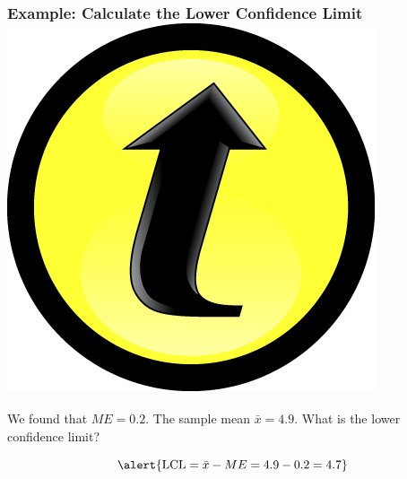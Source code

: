 \documentclass[handout]{beamer}
\begin{document}
\begin{frame}
\frametitle{Example: Calculate the Lower Confidence Limit \hfill \includegraphics[scale = 0.05]{./images/clicker}}


\begin{center}
\end{center}

We found that $ME=0.2$. The sample mean $\bar{x} = 4.9$. What is the lower confidence limit?
\pause

\vspace{2em}

	$$\alert{\mbox{LCL} = \bar{x} - ME= 4.9 - 0.2 = 4.7}$$

\end{frame}
\end{document}
